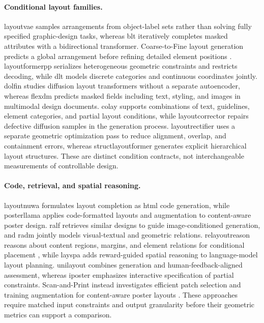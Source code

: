 \paragraph{Conditional layout families.}
\ac{layoutvae} samples arrangements from object-label sets rather than solving fully specified graphic-design tasks, whereas \ac{blt} iteratively completes masked attributes with a bidirectional transformer.
Coarse-to-Fine layout generation predicts a global arrangement before refining detailed element positions \citep{coarsetofine2022}.
\ac{layoutformerpp} serializes heterogeneous geometric constraints and restricts decoding, while \ac{dlt} models discrete categories and continuous coordinates jointly.
\ac{dolfin} studies diffusion layout transformers without a separate autoencoder, whereas \ac{flexdm} predicts masked fields including text, styling, and images in multimodal design documents.
\ac{colay} supports combinations of text, guidelines, element categories, and partial layout conditions, while \ac{layoutcorrector} repairs defective diffusion samples in the generation process.
\ac{layoutrectifier} uses a separate geometric optimization pass to reduce alignment, overlap, and containment errors, whereas \ac{structlayoutformer} generates explicit hierarchical layout structures.
These are distinct condition contracts, not interchangeable measurements of controllable design.

\paragraph{Code, retrieval, and spatial reasoning.}
\ac{layoutnuwa} formulates layout completion as \ac{html} code generation, while \ac{posterllama} applies code-formatted layouts and augmentation to content-aware poster design.
\ac{ralf} retrieves similar designs to guide image-conditioned generation, and \ac{radm} jointly models visual-textual and geometric relations.
\ac{relayoutreason} reasons about content regions, margins, and element relations for conditional placement \citep{relayoutreason2025}, while \ac{layspa} adds reward-guided spatial reasoning to language-model layout planning.
\ac{unilayout} combines generation and human-feedback-aligned assessment, whereas \ac{iposter} emphasizes interactive specification of partial constraints.
Scan-and-Print instead investigates efficient patch selection and training augmentation for content-aware poster layouts \citep{scanprint2025}.
These approaches require matched input constraints and output granularity before their geometric metrics can support a comparison.

